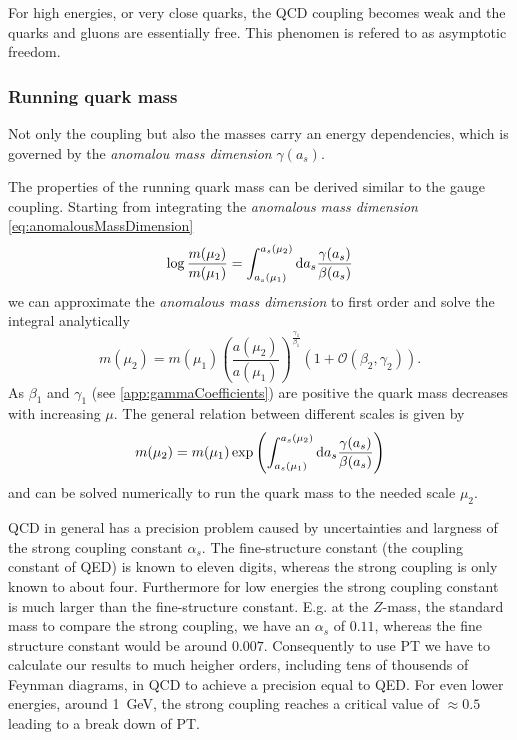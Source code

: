 \documentclass[../../index.tex]{subfiles}
\begin{document}
For high energies, or very close quarks, the QCD coupling becomes weak and the
quarks and gluons are essentially free. This phenomen is refered to as
asymptotic freedom.


\subsubsection{Running quark mass}
Not only the coupling but also the masses carry an energy dependencies, which is
governed by the \textit{anomalou mass dimension} $\gamma(a_s)$.

The properties of the running quark mass can be derived similar to the gauge
coupling. Starting from integrating the \textit{anomalous mass dimension}
\ref{eq:anomalousMassDimension}
\begin{equation}
  \log \frac{m(\mu_2)}{m(\mu_1)} = \int_{a_s(\mu_1)}^{a_s(\mu_2)} \dif a_s \frac{\gamma(a_s)}{\beta(a_s)}
\end{equation}
we can approximate the \textit{anomalous mass dimension} to first order and
solve the integral analytically \cite{Schwab2002}
\begin{equation}
  m(\mu_2) = m(\mu_1)\left( \frac{a(\mu_2)}{a(\mu_1)} \right)^{\frac{\gamma_1}{\beta_1}} \left( 1 + \mathcal{O}(\beta_2, \gamma_2) \right).
\end{equation}
As $\beta_1$ and $\gamma_1$ (see \ref{app:gammaCoefficients}) are positive the
quark mass decreases with increasing $\mu$. The general relation between
different scales is given by
\begin{equation}
  m(\mu_2) = m(\mu_1) \exp \left( \int_{a_s(\mu_1)}^{a_s(\mu_2)} \dif a_s \frac{\gamma(a_s)}{\beta(a_s)}  \right)
\end{equation}
and can be solved numerically to run the quark mass to the needed scale $\mu_2$.

QCD in general has a precision problem caused by uncertainties and largness of
the strong coupling constant $\alpha_s$. The fine-structure constant (the
coupling constant of QED) is known to eleven digits, whereas the strong coupling
is only known to about four. Furthermore for low energies the strong coupling
constant is much larger than the fine-structure constant. E.g. at the $Z$-mass,
the standard mass to compare the strong coupling, we have an $\alpha_s$ of
$0.11$, whereas the fine structure constant would be around $0.007$.
Consequently to use PT we have to calculate our results to much heigher orders,
including tens of thousends of Feynman diagrams, in QCD to achieve a precision
equal to QED. For even lower energies, around \SI{1}{\giga\eV}, the strong
coupling reaches a critical value of $\approx 0.5$ leading to a break down of
PT.
\end{document}

